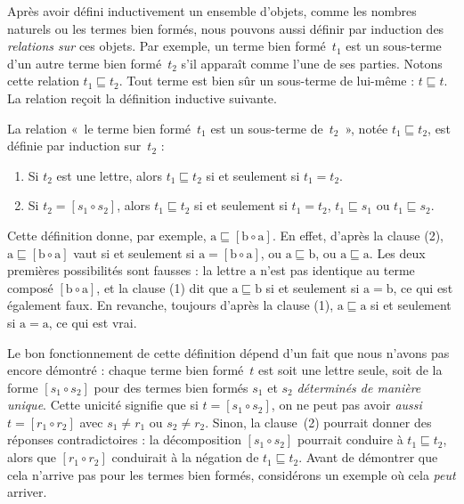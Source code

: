 \documentclass[../../../include/open-logic-section]{subfiles}
\begin{document}


Après avoir défini
inductivement un
ensemble d'objets,
comme les nombres
naturels ou les
termes bien formés,
nous pouvons aussi
définir par induction
des \emph{relations
sur} ces objets.
Par exemple, un
terme bien formé~$t_1$
est un sous-terme
d'un autre terme
bien formé~$t_2$
s'il apparaît
comme l'une
de ses parties.
Notons cette relation
$t_1 \sqsubseteq t_2$.
Tout terme est
bien sûr un
sous-terme de
lui-même :
$t \sqsubseteq t$.
La relation reçoit
la définition
inductive suivante.

\begin{defn}
  La relation
  «~le terme bien
  formé~$t_1$
  est un sous-terme
  de~$t_2$~»,
  notée
  $t_1 \sqsubseteq t_2$,
  est définie
  par induction
  sur~$t_2$ :
  \begin{enumerate}
  \item Si $t_2$
    est une lettre,
    alors
    $t_1 \sqsubseteq t_2$
    si et seulement
    si $t_1=t_2$.
  \item Si
    $t_2=[s_1 \circ s_2]$,
    alors
    $t_1 \sqsubseteq t_2$
    si et seulement
    si $t_1=t_2$,
    $t_1 \sqsubseteq s_1$
    ou
    $t_1 \sqsubseteq s_2$.
  \end{enumerate}
\end{defn}

Cette définition donne,
par exemple,
$\mathrm{a}
\sqsubseteq
[\mathrm{b}\circ\mathrm{a}]$.
En effet, d'après
la clause (2),
$\mathrm{a}\sqsubseteq
[\mathrm{b}\circ\mathrm{a}]$
vaut si et
seulement si
$\mathrm{a}
=[\mathrm{b}\circ\mathrm{a}]$,
ou
$\mathrm{a}
\sqsubseteq\mathrm{b}$,
ou
$\mathrm{a}
\sqsubseteq\mathrm{a}$.
Les deux premières
possibilités sont
fausses : la lettre
$\mathrm{a}$ n'est
pas identique au
terme composé
$[\mathrm{b}\circ\mathrm{a}]$,
et
la clause (1) dit
que
$\mathrm{a}
\sqsubseteq\mathrm{b}$
si et seulement si
$\mathrm{a}=\mathrm{b}$,
ce qui est également
faux. En revanche,
toujours d'après
la clause (1),
$\mathrm{a}
\sqsubseteq\mathrm{a}$
si et seulement si
$\mathrm{a}=\mathrm{a}$,
ce qui est vrai.

Le bon fonctionnement
de cette définition
dépend d'un fait
que nous n'avons
pas encore démontré :
chaque terme bien
formé~$t$ est
soit une lettre
seule, soit de
la forme
$[s_1\circ s_2]$
pour des termes
bien formés
$s_1$ et $s_2$
\emph{déterminés de
manière unique}.
Cette unicité
signifie que si
$t=[s_1\circ s_2]$,
on ne peut pas
avoir \emph{aussi}
$t=[r_1\circ r_2]$
avec $s_1\neq r_1$
ou $s_2\neq r_2$.
Sinon, la clause~(2)
pourrait donner
des réponses
contradictoires :
la décomposition
$[s_1\circ s_2]$
pourrait conduire
à $t_1\sqsubseteq t_2$,
alors que
$[r_1\circ r_2]$
conduirait à la
négation de
$t_1\sqsubseteq t_2$.
Avant
de démontrer que
cela n'arrive pas
pour les termes
bien formés,
considérons un
exemple où cela
\emph{peut} arriver.
\end{document}
